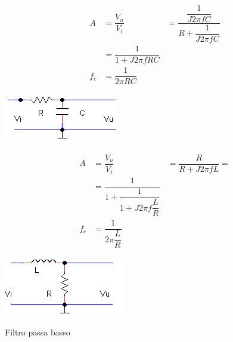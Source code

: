 \begin{table}
\begin{minipage}{0.4\textwidth}
      \centering
       \begin{align*}
A&=\dfrac{V_{u}}{V_{i}}
&=\dfrac{\dfrac{1}{J2\pi fC}}{R+\dfrac{1}{J2\pi fC}}\\
&=\dfrac{1}{1+J2\pi fRC}\\
f_{c}&=\dfrac{1}{2\pi RC}
        \end{align*}
     \end{minipage}\hfill
     \begin{minipage}{0.5\textwidth}
      \centering
       \includegraphics{filtro_PB_RC}
     \end{minipage}
\begin{minipage}{0.4\textwidth}
      \centering

       \begin{align*}
A&=\dfrac{V_{u}}{V_{i}}
&=\dfrac{R}{R+J2\pi fL}=\\
&=\dfrac{1}{1+\dfrac{1}{1+J2\pi f\dfrac{L}{R}}}\\
f_{c}&=\dfrac{1}{2\pi \dfrac{L}{R}}
        \end{align*}
     \end{minipage}\hfill
     \begin{minipage}{0.4\textwidth}
      \centering
       \includegraphics{filtro_PB_LR}
     \end{minipage}
\caption{Filtro passa basso}
\end{table}
